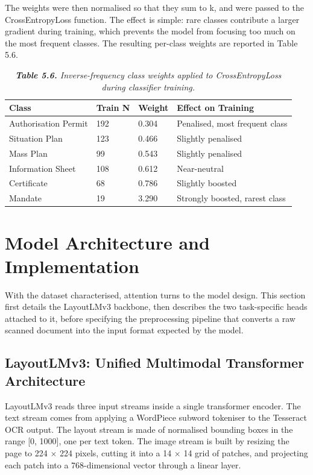 The weights were then normalised so that they sum to k, and were passed to the CrossEntropyLoss function. The effect is simple: rare classes contribute a larger gradient during training, which prevents the model from focusing too much on the most frequent classes. The resulting per-class weights are reported in Table 5.6.

\begin{table}[H]
  \centering
  \caption{\textit{\textbf{Table 5.6.} Inverse-frequency class weights applied to CrossEntropyLoss during classifier training.}}
  \renewcommand{\arraystretch}{1.0}
  \footnotesize
  \begin{tabularx}{\textwidth}{|X|X|X|X|}
    \hline
    \textbf{Class} & \textbf{Train N} & \textbf{Weight} & \textbf{Effect on Training} \\ \hline
    Authorisation Permit & 192 & 0.304 & Penalised, most frequent class \\ \hline
    Situation Plan & 123 & 0.466 & Slightly penalised \\ \hline
    Mass Plan & 99 & 0.543 & Slightly penalised \\ \hline
    Information Sheet & 108 & 0.612 & Near-neutral \\ \hline
    Certificate & 68 & 0.786 & Slightly boosted \\ \hline
    Mandate & 19 & 3.290 & Strongly boosted, rarest class \\ \hline
  \end{tabularx}
\end{table}

\section{Model Architecture and Implementation}

With the dataset characterised, attention turns to the model design. This section first details the LayoutLMv3 backbone, then describes the two task-specific heads attached to it, before specifying the preprocessing pipeline that converts a raw scanned document into the input format expected by the model.

\subsection{LayoutLMv3: Unified Multimodal Transformer Architecture}

LayoutLMv3 reads three input streams inside a single transformer encoder. The text stream comes from applying a WordPiece subword tokeniser to the Tesseract OCR output. The layout stream is made of normalised bounding boxes in the range [0, 1000], one per text token. The image stream is built by resizing the page to 224 $\times$ 224 pixels, cutting it into a 14 $\times$ 14 grid of patches, and projecting each patch into a 768-dimensional vector through a linear layer.

